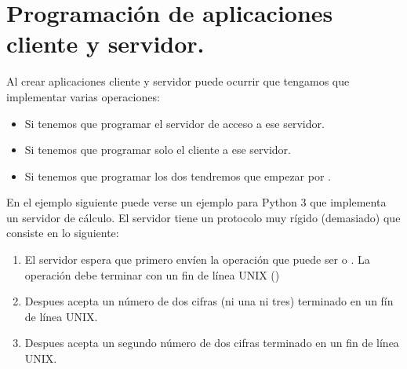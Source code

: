 \documentclass[letterpaper,10pt,spanish]{sphinxmanual}
\begin{document}
\section{Programación de aplicaciones cliente y servidor.}
\label{\detokenize{textos/tema3:programacion-de-aplicaciones-cliente-y-servidor}}
Al crear aplicaciones cliente y servidor puede ocurrir que tengamos que implementar varias operaciones:
\begin{itemize}
\item {} 
Si tenemos que programar el servidor  de acceso a ese servidor.

\item {} 
Si tenemos que programar solo el cliente  a ese servidor.

\item {} 
Si tenemos que programar los dos tendremos que empezar por .

\end{itemize}

En el ejemplo siguiente puede verse un ejemplo para Python 3 que implementa un servidor de cálculo. El servidor tiene un protocolo muy rígido (demasiado) que consiste en lo siguiente:
\begin{enumerate}
\def\theenumi{\arabic{enumi}}
\def\labelenumi{\theenumi .}
\makeatletter\def\p@enumii{\p@enumi \theenumi .}\makeatother
\item {} 
El servidor espera que primero envíen la operación que puede ser \sphinxcode{\sphinxupquote{+}} o \sphinxcode{\sphinxupquote{-}}. La operación debe terminar con un fin de línea UNIX ()

\item {} 
Despues acepta un número de dos cifras (ni una ni tres) terminado en un fín de línea UNIX.

\item {} 
Despues acepta un segundo número de dos cifras terminado en un fin de línea UNIX.

\end{enumerate}
\end{document}
